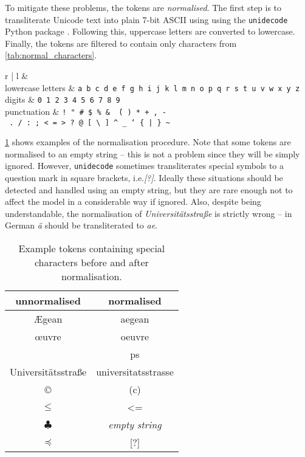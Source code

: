 \documentclass[draft]{IIBproject}
\makeatletter
\DeclareRobustCommand*{\ie}{i.e.\@\xspace}
\makeatother
\begin{document}
To mitigate these problems, the tokens are \emph{normalised}. The first step is to transliterate Unicode text into plain 7-bit ASCII using using the \texttt{unidecode} Python package \cite{lib:unidecode}. Following this, uppercase letters are converted to lowercase. Finally, the tokens are filtered to contain only characters from \cref{tab:normal_characters}.

\begin{table}[h]
	\centering
	\begin{tabular}{r | l}
	 &  \\
	\hline
	lowercase letters & \texttt{\footnotesize a b c d e f g h i j k l m n o p q r s t u v w x y z} \\
	digits & \texttt{\footnotesize 0 1 2 3 4 5 6 7 8 9} \\
	punctuation & \texttt{\footnotesize !\ "\ \#\ \$\ \%\ \&\ \'\ (\ )\ *\ +\ ,\ -\ .\ /\ :\ ;\ <\ =\ >\ ?\ @\ [\ \textbackslash\ ]\ \textasciicircum\ \_\ `\ \{\ |\ \}\ \textasciitilde}
	\end{tabular}
	\caption{\label{tab:normal_characters}Characters that can be a part of a normalised token.}
\end{table}

\cref{tab:normalisation_examples} shows examples of the normalisation procedure. Note that some tokens are normalised to an empty string -- this is not a problem since they will be simply ignored. However, \texttt{unidecode} sometimes transliterates special symbols to a question mark in square brackets, \ie \emph{[?]}. Ideally these situations should be detected and handled using an empty string, but they are rare enough not to affect the model in a considerable way if ignored. Also, despite being understandable, the normalisation of \emph{Universitätsstraße} is strictly wrong -- in German \emph{ä} should be transliterated to \emph{ae}\cite{standard:din5007v2}.

\begin{table}[h]
	\centering
	\begin{tabular}{c | c}
	unnormalised & normalised \\
	\hline
	Ægean & aegean \\
	œuvre & oeuvre \\
	\textsterling & ps \\
	Universitätsstraße & universitatsstrasse \\
	\copyright & (c) \\
	$\leq$ & \textless= \\
	$\clubsuit$ & \emph{empty string} \\
	$\preccurlyeq$ & [?]
	\end{tabular}
	\caption{\label{tab:normalisation_examples}Example tokens containing special characters before and after normalisation.}
\end{table}
\end{document}
